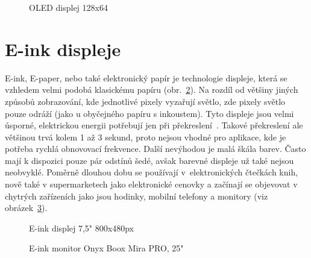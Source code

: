         \begin{figure}[htb]
        \caption{OLED displej 128x64~\cite{OLEDDisplay}}
        \label{OLED}
        \end{figure}

    \section{E-ink displeje} \label{EinkKapitola}
        E-ink, E-paper, nebo také elektronický papír je technologie displeje, která se vzhledem velmi podobá klasickému papíru (obr.~\ref{EinkDisp}). Na rozdíl od většiny jiných způsobů zobrazování, kde jednotlivé pixely vyzařují světlo, zde pixely světlo pouze odráží (jako u obyčejného papíru s inkoustem). Tyto displeje jsou velmi úsporné, elektrickou energii potřebují jen při překreslení~\cite{EinkToply}. Takové překreslení ale většinou trvá kolem 1 až 3 sekund, proto nejsou vhodné pro aplikace, kde je potřeba rychlá obnovovací frekvence. Další nevýhodou je malá škála barev. Často mají k dispozici pouze pár odstínů šedé, avšak barevné displeje už také nejsou neobvyklé. Poměrně dlouhou dobu se používají v~elektronických čtečkách knih, nově také v supermarketech jako elektronické cenovky a začínají se objevovat v chytrých zařízeních jako jsou hodinky, mobilní telefony a monitory (viz obrázek~\ref{EinkMon}).

        \begin{figure}[htb]
        \caption{E-ink displej 7,5" 800x480px~\cite{E-Ink800x480px}}
        \label{EinkDisp}
        \end{figure}
        
        \begin{figure}[htb]
        \caption{E-ink monitor Onyx Boox Mira PRO, 25"~\cite{ONYXBOOXMIRAPRO}}
        \label{EinkMon}
        \end{figure}
